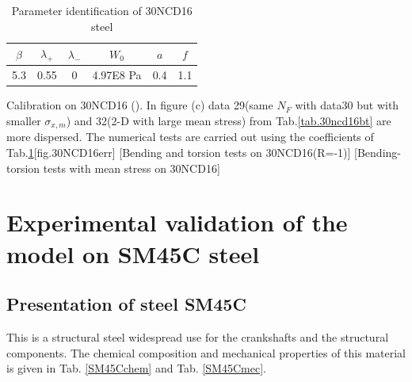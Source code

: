 \documentclass[3p,times,procedia,number]{elsarticle}
\begin{document}
\begin{table}[!h]
	\centering
	\begin{tabular}{|c|c|c|c|c|c|}
		\hline
		\textbf{$\beta$} & \textbf{$\lambda_+$} & \textbf{$\lambda_-$} & \textbf{$W_0$} & \textbf{$a$}& \textbf{$f$}  \\ \hline
		5.3     & 0.55 &0         &4.97E8 Pa  & 0.4& 1.1   \\ \hline
	\end{tabular}
	\caption{Parameter identification of 30NCD16 steel}
	\label{30ncdpara2}
\end{table}


\begin{Figure}[!h]{Calibration on  30NCD16 (\cite{Dubar1992}). In figure (c) data 29(same $N_F$ with data30 but with smaller $\sigma_{x,m}$) and 32(2-D with large mean stress)  from Tab.\ref{tab.30ncd16bt} are more dispersed. The numerical tests are carried out using the coefficients of Tab.\ref{30ncdpara2}}[fig.30NCD16err]
	[Bending and torsion tests on 30NCD16(R=-1)]
	[Bending-torsion tests with mean stress on 30NCD16]
\end{Figure}


\clearpage
\section{Experimental validation of the model on SM45C steel}
\subsection{Presentation of steel SM45C}
This is a structural steel widespread use for the crankshafts and the structural components. The chemical composition and mechanical properties of this material is given in Tab. \ref{SM45Cchem} and Tab. \ref{SM45Cmec}.
\end{document}
